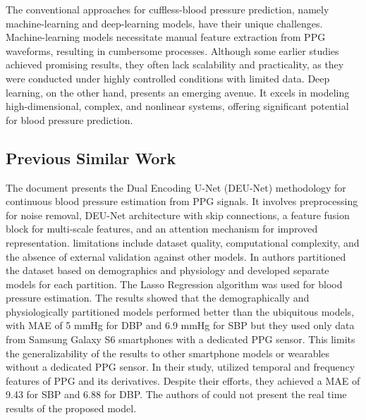 \documentclass[journal,twoside,web]{ieeecolor}
\begin{document}
The conventional approaches for cuffless-blood pressure prediction, namely machine-learning and deep-learning models, have their unique challenges. Machine-learning models necessitate manual feature extraction from PPG waveforms, resulting in cumbersome processes. Although some earlier studies achieved promising results, they often lack scalability and practicality, as they were conducted under highly controlled conditions with limited data. Deep learning, on the other hand, presents an emerging avenue. It excels in modeling high-dimensional, complex, and nonlinear systems, offering significant potential for blood pressure prediction. 
\subsection{Previous Similar Work}
The document \cite{b15} presents the Dual Encoding U-Net (DEU-Net) methodology for continuous blood pressure estimation from PPG signals. It involves preprocessing for noise removal, DEU-Net architecture with skip connections, a feature fusion block for multi-scale features, and an attention mechanism for improved representation. limitations include dataset quality, computational complexity, and the absence of external validation against other models. In \cite{b12} authors partitioned the dataset based on demographics and physiology and developed separate models for each partition. The Lasso Regression algorithm was used for blood pressure estimation. The results showed that the demographically and physiologically partitioned models performed better than the ubiquitous models, with MAE of 5 mmHg for DBP and 6.9 mmHg for SBP but they used only data from Samsung Galaxy S6 smartphones with a dedicated PPG sensor. This limits the generalizability of the results to other smartphone models or wearables without a dedicated PPG sensor. In their study, \cite{b3} utilized temporal and frequency features of PPG and its derivatives. Despite their efforts, they achieved a MAE of 9.43 for SBP and 6.88 for DBP. The authors of \cite{b4} could not present the real time results of the proposed model.
\end{document}
